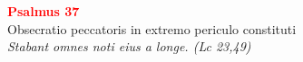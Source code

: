 


\def\greinitialformat#1{%
{\fontsize{39}{39}\selectfont #1}%
}




\vspace{0.3cm}
\begin{center}
 \textcolor{red}{\large \bf Psalmus 37}\\
Obsecratio peccatoris in extremo periculo constituti\\
\textit{\small Stabant omnes noti eius a longe. (Lc 23,49)}
\end{center}
